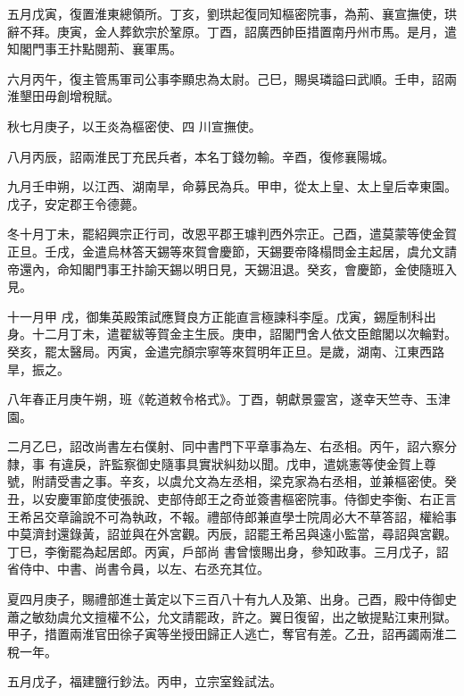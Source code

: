 \begin{pinyinscope}
 五月戊寅，復置淮東總領所。丁亥，劉珙起復同知樞密院事，為荊、襄宣撫使，珙辭不拜。庚寅，金人葬欽宗於鞏原。丁酉，詔廣西帥臣措置南丹州市馬。是月，遣知閣門事王抃點閱荊、襄軍馬。



 六月丙午，復主管馬軍司公事李顯忠為太尉。己巳，賜吳璘謚曰武順。壬申，詔兩淮墾田毋創增稅賦。



 秋七月庚子，以王炎為樞密使、四
 川宣撫使。



 八月丙辰，詔兩淮民丁充民兵者，本名丁錢勿輸。辛酉，復修襄陽城。



 九月壬申朔，以江西、湖南旱，命募民為兵。甲申，從太上皇、太上皇后幸東園。戊子，安定郡王令德薨。



 冬十月丁未，罷紹興宗正行司，改恩平郡王璩判西外宗正。己酉，遣莫蒙等使金賀正旦。壬戌，金遣烏林答天錫等來賀會慶節，天錫要帝降榻問金主起居，虞允文請帝還內，命知閣門事王抃諭天錫以明日見，天錫沮退。癸亥，會慶節，金使隨班入見。



 十一月甲
 戌，御集英殿策試應賢良方正能直言極諫科李垕。戊寅，錫垕制科出身。十二月丁未，遣翟紱等賀金主生辰。庚申，詔閣門舍人依文臣館閣以次輪對。癸亥，罷太醫局。丙寅，金遣完顏宗寧等來賀明年正旦。是歲，湖南、江東西路旱，振之。



 八年春正月庚午朔，班《乾道敕令格式》。丁酉，朝獻景靈宮，遂幸天竺寺、玉津園。



 二月乙巳，詔改尚書左右僕射、同中書門下平章事為左、右丞相。丙午，詔六察分隸，事
 有違戾，許監察御史隨事具實狀糾劾以聞。戊申，遣姚憲等使金賀上尊號，附請受書之事。辛亥，以虞允文為左丞相，梁克家為右丞相，並兼樞密使。癸丑，以安慶軍節度使張說、吏部侍郎王之奇並簽書樞密院事。侍御史李衡、右正言王希呂交章論說不可為執政，不報。禮部侍郎兼直學士院周必大不草答詔，權給事中莫濟封還錄黃，詔並與在外宮觀。丙辰，詔罷王希呂與遠小監當，尋詔與宮觀。丁巳，李衡罷為起居郎。丙寅，戶部尚
 書曾懷賜出身，參知政事。三月戊子，詔省侍中、中書、尚書令員，以左、右丞充其位。



 夏四月庚子，賜禮部進士黃定以下三百八十有九人及第、出身。己酉，殿中侍御史蕭之敏劾虞允文擅權不公，允文請罷政，許之。翼日復留，出之敏提點江東刑獄。甲子，措置兩淮官田徐子寅等坐授田歸正人逃亡，奪官有差。乙丑，詔再蠲兩淮二稅一年。



 五月戊子，福建鹽行鈔法。丙申，立宗室銓試法。




\end{pinyinscope}
